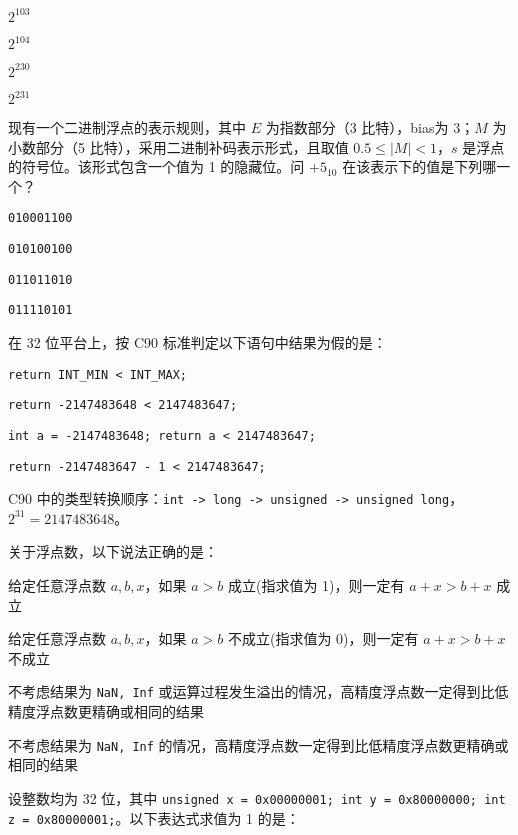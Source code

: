 \begin{problems}
		\begin{choices}
			\item $2^{103}$
			\item $2^{104}$
			\item $2^{230}$
			\item $2^{231}$
		\end{choices}
		 现有一个二进制浮点的表示规则，其中 $E$ 为指数部分（3 比特），bias为 3；$M$ 为小数部分（5 比特），采用二进制补码表示形式，且取值 $0.5 \leq |M|<1$，$s$ 是浮点的符号位。该形式包含一个值为 1 的隐藏位。问 $+5_{10}$ 在该表示下的值是下列哪一个？
		\begin{choices}
			\item \texttt{010001100}
			\item \texttt{010100100}
			\item \texttt{011011010}
			\item \texttt{011110101}
		\end{choices}
		 在 32 位平台上，按 C90 标准判定以下语句中结果为假的是：
		\begin{choices}
			\item \verb|return INT_MIN < INT_MAX;|
			\item \verb|return -2147483648 < 2147483647;|
			\item \verb|int a = -2147483648; return a < 2147483647;|
			\item \verb|return -2147483647 - 1 < 2147483647;|
		\end{choices}
		\begin{hint}
			C90 中的类型转换顺序：\texttt{int -> long -> unsigned -> unsigned long}，$2^{31}=2147483648$。
		\end{hint}
		 关于浮点数，以下说法正确的是：
		\begin{choices}
			\item 给定任意浮点数 $a, b, x$，如果 $a>b$ 成立(指求值为 1)，则一定有 $a+x>b+x$ 成立
			\item 给定任意浮点数 $a, b, x$，如果 $a>b$ 不成立(指求值为 0)，则一定有 $a+x>b+x$ 不成立
			\item 不考虑结果为 \texttt{NaN, Inf} 或运算过程发生溢出的情况，高精度浮点数一定得到比低精度浮点数更精确或相同的结果
			\item 不考虑结果为 \texttt{NaN, Inf} 的情况，高精度浮点数一定得到比低精度浮点数更精确或相同的结果
		\end{choices}
		 设整数均为 32 位，其中 \texttt{unsigned x = 0x00000001; int y = 0x80000000; int z = 0x80000001;}。以下表达式求值为 1 的是：

\end{problems}
